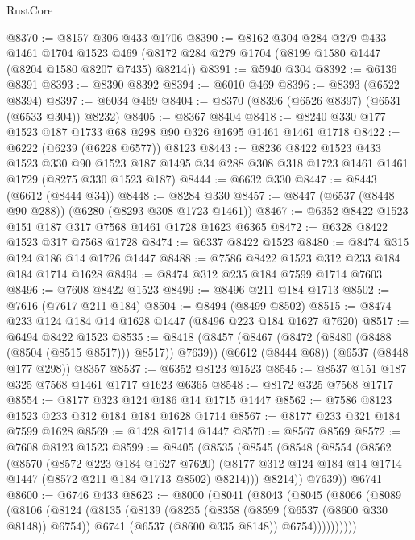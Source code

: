 \begin{lexlean}{RustCore}
\begin{coremodule}
@8370 := @8157 @306 @433 @1706
@8390 := @8162
    @304
    @284
    @279
    @433
    @1461
    @1704
    @1523
    @469
    (@8172 @284 @279 @1704 (@8199 @1580 @1447 (@8204 @1580 @8207 @7435) @8214))
@8391 := @5940 @304
@8392 := @6136 @8391
@8393 := @8390 @8392
@8394 := @6010 @469
@8396 := @8393 (@6522 @8394)
@8397 := @6034 @469
@8404 := @8370 (@8396 (@6526 @8397) (@6531 (@6533 @304)) @8232)
@8405 := @8367 @8404
@8418 := @8240 @330 @177 @1523 @187 @1733 @68 @298 @90 @326 @1695 @1461 @1461 @1718
@8422 := @6222 (@6239 (@6228 @6577)) @8123
@8443 := @8236
    @8422
    @1523
    @433
    @1523
    @330
    @90
    @1523
    @187
    @1495
    @34
    @288
    @308
    @318
    @1723
    @1461
    @1461
    @1729
    (@8275 @330 @1523 @187)
@8444 := @6632 @330
@8447 := @8443 (@6612 (@8444 @34))
@8448 := @8284 @330
@8457 := @8447 (@6537 (@8448 @90 @288)) (@6280 (@8293 @308 @1723 @1461))
@8467 := @6352 @8422 @1523 @151 @187 @317 @7568 @1461 @1728 @1623 @6365
@8472 := @6328 @8422 @1523 @317 @7568 @1728
@8474 := @6337 @8422 @1523
@8480 := @8474 @315 @124 @186 @14 @1726 @1447
@8488 := @7586 @8422 @1523 @312 @233 @184 @184 @1714 @1628
@8494 := @8474 @312 @235 @184 @7599 @1714 @7603
@8496 := @7608 @8422 @1523
@8499 := @8496 @211 @184 @1713
@8502 := @7616 (@7617 @211 @184)
@8504 := @8494 (@8499 @8502)
@8515 := @8474 @233 @124 @184 @14 @1628 @1447 (@8496 @223 @184 @1627 @7620)
@8517 := @6494 @8422 @1523
@8535 := @8418
    (@8457 (@8467 (@8472 (@8480 (@8488 (@8504 (@8515 @8517))) @8517)) @7639))
    (@6612 (@8444 @68))
    (@6537 (@8448 @177 @298))
    @8357
@8537 := @6352 @8123 @1523
@8545 := @8537 @151 @187 @325 @7568 @1461 @1717 @1623 @6365
@8548 := @8172 @325 @7568 @1717
@8554 := @8177 @323 @124 @186 @14 @1715 @1447
@8562 := @7586 @8123 @1523 @233 @312 @184 @184 @1628 @1714
@8567 := @8177 @233 @321 @184 @7599 @1628
@8569 := @1428 @1714 @1447
@8570 := @8567 @8569
@8572 := @7608 @8123 @1523
@8599 := @8405
    (@8535
      (@8545
        (@8548
          (@8554
            (@8562
              (@8570
                (@8572 @223 @184 @1627 @7620)
                (@8177 @312 @124 @184 @14 @1714 @1447 (@8572 @211 @184 @1713 @8502) @8214)))
            @8214))
        @7639))
    @6741
@8600 := @6746 @433
@8623 := @8000
    (@8041
      (@8043
        (@8045
          (@8066
            (@8089
              (@8106
                (@8124
                  (@8135
                    (@8139
                      (@8235
                        (@8358 (@8599 (@6537 (@8600 @330 @8148)) @6754))
                        @6741
                        (@6537 (@8600 @335 @8148))
                        @6754))))))))))

\end{coremodule}
\end{lexlean}
